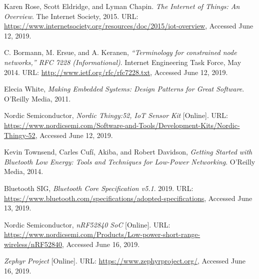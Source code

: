 \begin{thebibliography}{9}

        Karen Rose, Scott Eldridge, and Lyman Chapin.
        \textit{The Internet of Things: An Overview}.
        The Internet Society,
        2015.
        URL: \url{https://www.internetsociety.org/resources/doc/2015/iot-overview},
        Accessed June 12, 2019.

        C. Bormann, M. Ersue, and A. Keranen,
        \textit{“Terminology for constrained node networks,” RFC 7228 (Informational)}.
        Internet Engineering Task Force,
        May 2014.
        URL: \url{http://www.ietf.org/rfc/rfc7228.txt},
        Accessed June 12, 2019.

        Elecia White,
        \textit{Making Embedded Systems: Design Patterns for Great Software}.
        O'Reilly Media, 
        2011.

        Nordic Semiconductor,
        \textit{Nordic Thingy:52, IoT Sensor Kit} [Online].
        URL: \url{https://www.nordicsemi.com/Software-and-Tools/Development-Kits/Nordic-Thingy-52},
        Accessed June 12, 2019.

        Kevin Townsend, Carles Cufí, Akiba, and Robert Davidson,
        \textit{Getting Started with Bluetooth Low Energy: Tools and Techniques for Low-Power Networking}.
        O'Reilly Media, 
        2014.

        Bluetooth SIG,
        \textit{Bluetooth Core Specification v5.1}.
        2019.
        URL: \url{https://www.bluetooth.com/specifications/adopted-specifications},
        Accessed June 13, 2019.

        Nordic Semiconductor,
        \textit{nRF52840 SoC} [Online].
        URL: \url{https://www.nordicsemi.com/Products/Low-power-short-range-wireless/nRF52840},
        Accessed June 16, 2019.

        \textit{Zephyr Project} [Online].
        URL: \url{https://www.zephyrproject.org/},
        Accessed June 16, 2019.
        
\end{thebibliography}